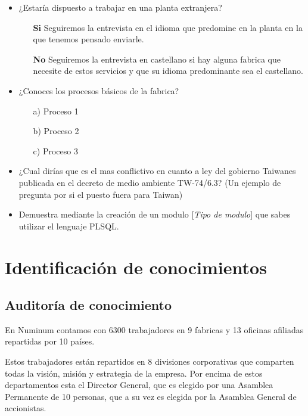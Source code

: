 \documentclass[twoside]{article}
\begin{document}
\begin{itemize}
		\item ¿Estaría dispuesto a trabajar en una planta extranjera?
		\begin{itemize}
			\item[\textbf{Si}] Seguiremos la entrevista en el idioma que predomine en la planta en la que tenemos pensado enviarle.
			\item[\textbf{No}] Seguiremos la entrevista en castellano si hay alguna fabrica que necesite de estos servicios y que su idioma predominante sea el castellano.
		\end{itemize}
	\item ¿Conoces los procesos básicos de la fabrica?
	\begin{itemize}
		\item[a)] Proceso 1
		\item[b)] Proceso 2
		\item[c)] Proceso 3
	\end{itemize}
	
	\item ¿Cual dirías que es el mas conflictivo en cuanto a ley del gobierno Taiwanes publicada en el decreto de medio ambiente TW-74/6.3? (Un ejemplo de pregunta por si el puesto fuera para Taiwan)
	\item Demuestra mediante la creación de un modulo  [\textit{Tipo de modulo}] que sabes utilizar el lenguaje PLSQL.

\end{itemize}


\newpage

\section{Identificación de conocimientos}

\subsection{Auditoría de conocimiento}

En Numinum contamos con 6300 trabajadores en 9 fabricas y 13 oficinas afiliadas repartidas por 10 países.\par
Estos trabajadores están repartidos en 8 divisiones corporativas que comparten todas la visión, misión y estrategia de la empresa.
Por encima de estos departamentos esta el Director General, que es elegido por una Asamblea Permanente de 10 personas, que a su vez es elegida por la Asamblea General de accionistas.
\end{document}

